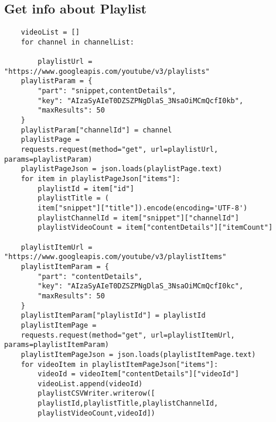 \documentclass[10pt]{article}
\begin{document}
	\subsection{Get info about Playlist}
	\begin{lstlisting}
	videoList = []
	for channel in channelList:
	
		playlistUrl = "https://www.googleapis.com/youtube/v3/playlists"
	playlistParam = {
		"part": "snippet,contentDetails",
		"key": "AIzaSyAIeT0DZSZPNgDlaS_3NsaOiMCmQcfI0kb",
		"maxResults": 50
	}
	playlistParam["channelId"] = channel
	playlistPage = 
	requests.request(method="get", url=playlistUrl, params=playlistParam)
	playlistPageJson = json.loads(playlistPage.text)
	for item in playlistPageJson["items"]:
		playlistId = item["id"]
		playlistTitle = (
		item["snippet"]["title"]).encode(encoding='UTF-8')
		playlistChannelId = item["snippet"]["channelId"]
		playlistVideoCount = item["contentDetails"]["itemCount"]
	
	playlistItemUrl = "https://www.googleapis.com/youtube/v3/playlistItems"
	playlistItemParam = {
		"part": "contentDetails",
		"key": "AIzaSyAIeT0DZSZPNgDlaS_3NsaOiMCmQcfI0kc",
		"maxResults": 50
	}
	playlistItemParam["playlistId"] = playlistId
	playlistItemPage = 
	requests.request(method="get", url=playlistItemUrl, params=playlistItemParam)
	playlistItemPageJson = json.loads(playlistItemPage.text)
	for videoItem in playlistItemPageJson["items"]:
		videoId = videoItem["contentDetails"]["videoId"]
		videoList.append(videoId)
		playlistCSVWriter.writerow([
		playlistId,playlistTitle,playlistChannelId,
		playlistVideoCount,videoId])
	
	\end{lstlisting}
\end{document}
